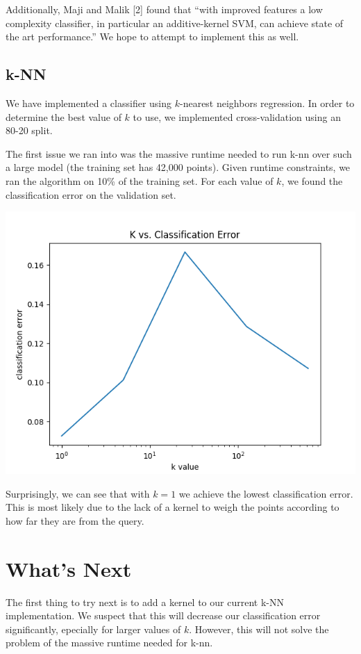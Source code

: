 \documentclass{article} %
\begin{document}
Additionally, Maji and Malik [2] found that ``with improved features a low
complexity classifier, in particular
an additive-kernel SVM, can achieve state of the art performance.'' We hope to
attempt to implement this as well.

\subsection{k-NN}
We have implemented a classifier using $k$-nearest neighbors regression. In
order to determine the best value of $k$ to use, we implemented cross-validation
using an 80-20 split.

The first issue we ran into was the massive runtime needed to run k-nn over such
a large model (the training set has 42,000 points). Given runtime constraints,
we ran the algorithm on 10\% of the training set.
For each value of $k$, we found the classification error on the validation set.

\includegraphics{k-nn.png}

Surprisingly, we can see that with $k = 1$ we achieve the lowest classification
error. This is most likely due to the lack of a kernel to weigh the points
according to how far they are from the query.

\section{What's Next}

The first thing to try next is to add a kernel to our current k-NN
implementation. We suspect that this will decrease our classification error
significantly, epecially for larger values of $k$. However, this will not solve
the problem of the massive runtime needed for k-nn.
\end{document}
